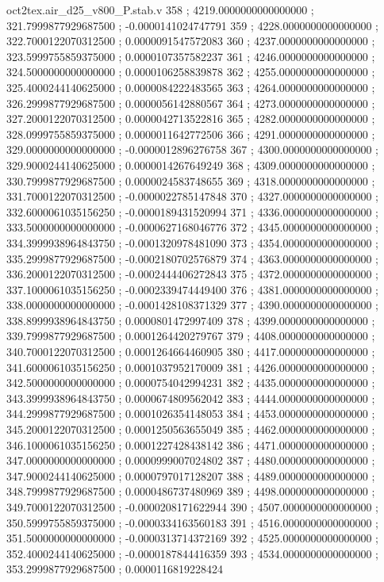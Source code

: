 \begin{filecontents}[overwrite]{oct2tex.air_d25_v800_P.stab.v}
358 ; 4219.0000000000000000 ; 321.7999877929687500 ; -0.0000141024747791
359 ; 4228.0000000000000000 ; 322.7000122070312500 ; 0.0000091547572083
360 ; 4237.0000000000000000 ; 323.5999755859375000 ; 0.0000107357582237
361 ; 4246.0000000000000000 ; 324.5000000000000000 ; 0.0000106258839878
362 ; 4255.0000000000000000 ; 325.4000244140625000 ; 0.0000084222483565
363 ; 4264.0000000000000000 ; 326.2999877929687500 ; 0.0000056142880567
364 ; 4273.0000000000000000 ; 327.2000122070312500 ; 0.0000042713522816
365 ; 4282.0000000000000000 ; 328.0999755859375000 ; 0.0000011642772506
366 ; 4291.0000000000000000 ; 329.0000000000000000 ; -0.0000012896276758
367 ; 4300.0000000000000000 ; 329.9000244140625000 ; 0.0000014267649249
368 ; 4309.0000000000000000 ; 330.7999877929687500 ; 0.0000024583748655
369 ; 4318.0000000000000000 ; 331.7000122070312500 ; -0.0000022785147848
370 ; 4327.0000000000000000 ; 332.6000061035156250 ; -0.0000189431520994
371 ; 4336.0000000000000000 ; 333.5000000000000000 ; -0.0000627168046776
372 ; 4345.0000000000000000 ; 334.3999938964843750 ; -0.0001320978481090
373 ; 4354.0000000000000000 ; 335.2999877929687500 ; -0.0002180702576879
374 ; 4363.0000000000000000 ; 336.2000122070312500 ; -0.0002444406272843
375 ; 4372.0000000000000000 ; 337.1000061035156250 ; -0.0002339474449400
376 ; 4381.0000000000000000 ; 338.0000000000000000 ; -0.0001428108371329
377 ; 4390.0000000000000000 ; 338.8999938964843750 ; 0.0000801472997409
378 ; 4399.0000000000000000 ; 339.7999877929687500 ; 0.0001264420279767
379 ; 4408.0000000000000000 ; 340.7000122070312500 ; 0.0001264664460905
380 ; 4417.0000000000000000 ; 341.6000061035156250 ; 0.0001037952170009
381 ; 4426.0000000000000000 ; 342.5000000000000000 ; 0.0000754042994231
382 ; 4435.0000000000000000 ; 343.3999938964843750 ; 0.0000674809562042
383 ; 4444.0000000000000000 ; 344.2999877929687500 ; 0.0001026354148053
384 ; 4453.0000000000000000 ; 345.2000122070312500 ; 0.0001250563655049
385 ; 4462.0000000000000000 ; 346.1000061035156250 ; 0.0001227428438142
386 ; 4471.0000000000000000 ; 347.0000000000000000 ; 0.0000999007024802
387 ; 4480.0000000000000000 ; 347.9000244140625000 ; 0.0000797017128207
388 ; 4489.0000000000000000 ; 348.7999877929687500 ; 0.0000486737480969
389 ; 4498.0000000000000000 ; 349.7000122070312500 ; -0.0000208171622944
390 ; 4507.0000000000000000 ; 350.5999755859375000 ; -0.0000334163560183
391 ; 4516.0000000000000000 ; 351.5000000000000000 ; -0.0000313714372169
392 ; 4525.0000000000000000 ; 352.4000244140625000 ; -0.0000187844416359
393 ; 4534.0000000000000000 ; 353.2999877929687500 ; 0.0000116819228424

\end{filecontents}
